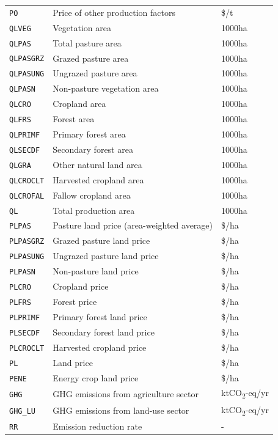 \begin{xltabular}{\linewidth}{l X l}
  \texttt{PO} & Price of other production factors & \$/t \\
  \texttt{QLVEG} & Vegetation area & 1000ha \\
  \texttt{QLPAS} & Total pasture area & 1000ha \\
  \texttt{QLPASGRZ} & Grazed pasture area & 1000ha \\
  \texttt{QLPASUNG} & Ungrazed pasture area & 1000ha \\
  \texttt{QLPASN} & Non-pasture vegetation area & 1000ha \\
  \texttt{QLCRO} & Cropland area & 1000ha \\
  \texttt{QLFRS} & Forest area & 1000ha \\
  \texttt{QLPRIMF} & Primary forest area & 1000ha \\
  \texttt{QLSECDF} & Secondary forest area & 1000ha \\
  \texttt{QLGRA} & Other natural land area & 1000ha \\
  \texttt{QLCROCLT} & Harvested cropland area & 1000ha \\
  \texttt{QLCROFAL} & Fallow cropland area & 1000ha \\
  \texttt{QL} & Total production area & 1000ha \\
  \texttt{PLPAS} & Pasture land price (area-weighted average) & \$/ha \\
  \texttt{PLPASGRZ} & Grazed pasture land price & \$/ha \\
  \texttt{PLPASUNG} & Ungrazed pasture land price & \$/ha \\
  \texttt{PLPASN} & Non-pasture land price & \$/ha \\
  \texttt{PLCRO} & Cropland price & \$/ha \\
  \texttt{PLFRS} & Forest price & \$/ha \\
  \texttt{PLPRIMF} & Primary forest land price & \$/ha \\
  \texttt{PLSECDF} & Secondary forest land price & \$/ha \\
  \texttt{PLCROCLT} & Harvested cropland price & \$/ha \\
  \texttt{PL} & Land price & \$/ha \\
  \texttt{PENE} & Energy crop land price & \$/ha \\
  \texttt{GHG} & GHG emissions from agriculture sector & ktCO\textsubscript{2}-eq/yr \\
  \texttt{GHG\_LU} & GHG emissions from land-use sector & ktCO\textsubscript{2}-eq/yr \\
  \texttt{RR} & Emission reduction rate & - \\

\end{xltabular}
